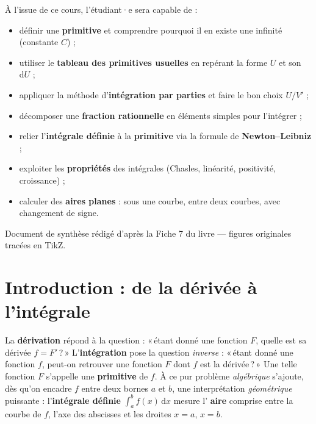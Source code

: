 \documentclass[11pt,a4paper]{article}
\newcommand{\dd}{\mathrm{d}}
\begin{document}
\begin{tcolorbox}[boxbase,colback=primary!5,colframe=primary,width=15cm,
    title={\textsc{Objectifs pédagogiques de la fiche}}]
À l'issue de ce cours, l'étudiant·e sera capable de :
\begin{itemize}[leftmargin=1.6em,topsep=2pt,itemsep=1pt]
  \item définir une \textbf{primitive} et comprendre pourquoi il en existe une infinité (constante $C$) ;
  \item utiliser le \textbf{tableau des primitives usuelles} en repérant la forme $U$ et son $\dd U$ ;
  \item appliquer la méthode d'\textbf{intégration par parties} et faire le bon choix $U/V'$ ;
  \item décomposer une \textbf{fraction rationnelle} en éléments simples pour l'intégrer ;
  \item relier l'\textbf{intégrale définie} à la \textbf{primitive} via la formule de \textbf{Newton--Leibniz} ;
  \item exploiter les \textbf{propriétés} des intégrales (Chasles, linéarité, positivité, croissance) ;
  \item calculer des \textbf{aires planes} : sous une courbe, entre deux courbes, avec changement de signe.
\end{itemize}
\end{tcolorbox}

\vspace{0.5cm}
{\small\color{black!60} Document de synthèse rédigé d'après la Fiche 7 du livre — figures originales tracées en TikZ.}
\par
\endgroup

\newpage
\renewcommand{\contentsname}{\textcolor{primarydark}{Table des matières}}
\tableofcontents
\thispagestyle{fancy}
\newpage

\section{Introduction : de la dérivée à l'intégrale}
La \textbf{dérivation} répond à la question : «\,étant donné une fonction $F$, quelle est sa
dérivée $f=F'$\,?\,» L'\textbf{intégration} pose la question \emph{inverse} :
«\,étant donné une fonction $f$, peut-on retrouver une fonction $F$ dont $f$ est la
dérivée\,?\,» Une telle fonction $F$ s'appelle une \textbf{primitive} de $f$. À ce pur problème
\emph{algébrique} s'ajoute, dès qu'on encadre $f$ entre deux bornes $a$ et $b$, une interprétation
\emph{géométrique} puissante : l'\textbf{intégrale définie} $\int_a^b f(x)\,\dd x$ mesure l'
\textbf{aire} comprise entre la courbe de $f$, l'axe des abscisses et les droites $x=a$, $x=b$.
\end{document}
